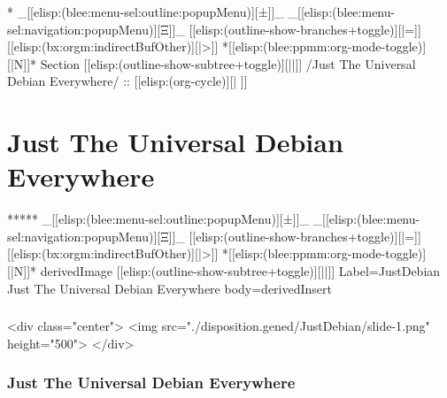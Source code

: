 \begin{whenOrg}
\begin{whenOrg}
*  _[[elisp:(blee:menu-sel:outline:popupMenu)][±]]_ _[[elisp:(blee:menu-sel:navigation:popupMenu)][Ξ]]_ [[elisp:(outline-show-branches+toggle)][|=]] [[elisp:(bx:orgm:indirectBufOther)][|>]] *[[elisp:(blee:ppmm:org-mode-toggle)][|N]]*  Section    [[elisp:(outline-show-subtree+toggle)][||]]   /Just The Universal Debian Everywhere/ ::  [[elisp:(org-cycle)][| ]]
\end{whenOrg}

\section{Just The Universal Debian Everywhere}

\begin{whenOrg}
*****  _[[elisp:(blee:menu-sel:outline:popupMenu)][±]]_ _[[elisp:(blee:menu-sel:navigation:popupMenu)][Ξ]]_ [[elisp:(outline-show-branches+toggle)][|=]] [[elisp:(bx:orgm:indirectBufOther)][|>]] *[[elisp:(blee:ppmm:org-mode-toggle)][|N]]*  derivedImage [[elisp:(outline-show-subtree+toggle)][||]] Label=JustDebian Just The Universal Debian Everywhere body=derivedInsert
\end{whenOrg}

\begin{htmlonly}

\begin{frame}[fragile,plain,label=JustDebian]
    \frametitle{}
    \framesubtitle{}
    \begin{rawhtml}
<div class="center">
<img src="./disposition.gened/JustDebian/slide-1.png" height="500">
</div>
    \end{rawhtml}
\end{frame}
\end{htmlonly}

\begin{verblatex}

\begin{frame}[fragile,plain,label=JustDebian]
    \frametitle{Just The Universal Debian Everywhere}
    \framesubtitle{}


\end{frame}
\end{verblatex}
\end{whenOrg}
